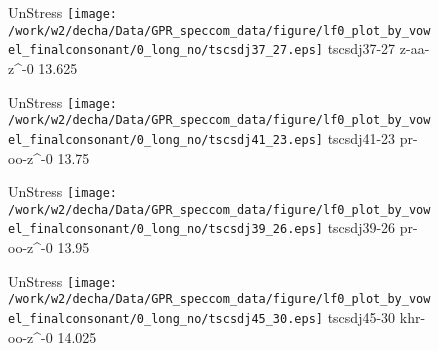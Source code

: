 \documentclass{article}
\begin{document}
\begin{figure}[t]
\begin{minipage}[b]{.24\textwidth}
UnStress
\centering
\texttt{[image: /work/w2/decha/Data/GPR\_speccom\_data/figure/lf0\_plot\_by\_vowel\_finalconsonant/0\_long\_no/tscsdj37\_27.eps]}
tscsdj37-27 z-aa-z\textasciicircum-0 13.625
\end{minipage}
\begin{minipage}[b]{.24\textwidth}
UnStress
\centering
\texttt{[image: /work/w2/decha/Data/GPR\_speccom\_data/figure/lf0\_plot\_by\_vowel\_finalconsonant/0\_long\_no/tscsdj41\_23.eps]}
tscsdj41-23 pr-oo-z\textasciicircum-0 13.75
\end{minipage}
\begin{minipage}[b]{.24\textwidth}
UnStress
\centering
\texttt{[image: /work/w2/decha/Data/GPR\_speccom\_data/figure/lf0\_plot\_by\_vowel\_finalconsonant/0\_long\_no/tscsdj39\_26.eps]}
tscsdj39-26 pr-oo-z\textasciicircum-0 13.95
\end{minipage}
\begin{minipage}[b]{.24\textwidth}
UnStress
\centering
\texttt{[image: /work/w2/decha/Data/GPR\_speccom\_data/figure/lf0\_plot\_by\_vowel\_finalconsonant/0\_long\_no/tscsdj45\_30.eps]}
tscsdj45-30 khr-oo-z\textasciicircum-0 14.025
\end{minipage}
\end{figure}
\end{document}
